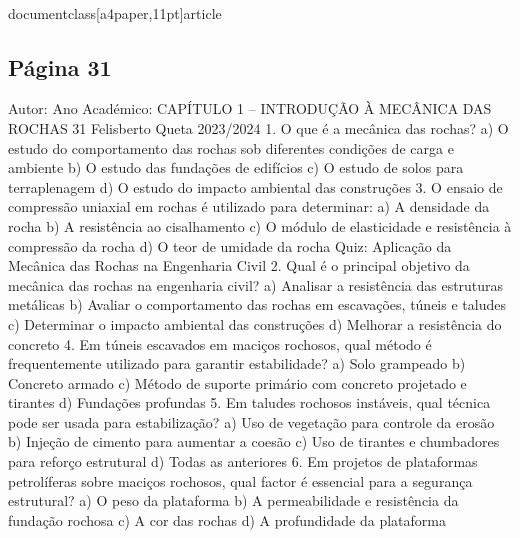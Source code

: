 \\documentclass[a4paper,11pt]{article}
\begin{document}
\subsection*{Página 31}
Autor:
Ano Académico:
CAPÍTULO 1 – INTRODUÇÃO À MECÂNICA DAS ROCHAS
31
Felisberto Queta
2023/2024
1. O que é a mecânica das rochas?
a) O estudo do comportamento das rochas sob diferentes condições de carga e ambiente
b) O estudo das fundações de edifícios
c) O estudo de solos para terraplenagem
d) O estudo do impacto ambiental das construções
3. O ensaio de compressão uniaxial em rochas é utilizado para determinar:
a) A densidade da rocha
b) A resistência ao cisalhamento
c) O módulo de elasticidade e resistência à compressão da rocha
d) O teor de umidade da rocha
Quiz: Aplicação da 
Mecânica das 
Rochas na 
Engenharia Civil
2. Qual é o principal objetivo da mecânica das rochas na engenharia civil?
a) Analisar a resistência das estruturas metálicas
b) Avaliar o comportamento das rochas em escavações, túneis e taludes
c) Determinar o impacto ambiental das construções
d) Melhorar a resistência do concreto
4. Em túneis escavados em maciços rochosos, qual método é frequentemente utilizado para garantir estabilidade?
a) Solo grampeado
b) Concreto armado
c) Método de suporte primário com concreto projetado e tirantes
d) Fundações profundas
5. Em taludes rochosos instáveis, qual técnica pode ser usada para estabilização?
a) Uso de vegetação para controle da erosão
b) Injeção de cimento para aumentar a coesão
c) Uso de tirantes e chumbadores para reforço estrutural
d) Todas as anteriores
6. Em projetos de plataformas petrolíferas sobre maciços rochosos, qual factor é essencial para a segurança estrutural?
a) O peso da plataforma
b) A permeabilidade e resistência da fundação rochosa
c) A cor das rochas
d) A profundidade da plataforma
\end{document}
